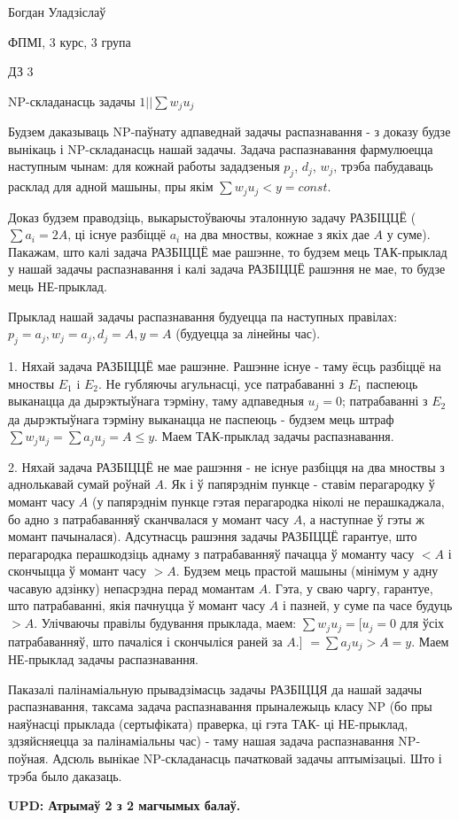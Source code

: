 \documentclass{article}
\begin{document}
{\large

Богдан Уладзіслаў

ФПМІ, 3 курс, 3 група

\vspace{5mm}

ДЗ 3

NP-складанасць задачы $1||\sum w_j u_j$

}

\vspace{15mm}

Будзем даказываць NP-паўнату адпаведнай задачы распазнавання - з доказу будзе вынікаць і NP-складанасць нашай задачы.
Задача распазнавання фармулюецца наступным чынам: для кожнай работы зададзеныя $p_j$, $d_j$, $w_j$, трэба пабудаваць
расклад для адной машыны, пры якім $\sum w_j u_j < y = const$.

Доказ будзем праводзіць, выкарыстоўваючы эталонную задачу РАЗБІЦЦЁ ($\sum a_i = 2A$, ці існуе разбіццё $a_i$ на два мноствы,
кожнае з якіх дае $A$ у суме). Пакажам, што калі задача РАЗБІЦЦЁ мае рашэнне, то
будзем мець ТАК-прыклад у нашай задачы распазнавання і калі задача РАЗБІЦЦЁ рашэння не мае, то будзе мець НЕ-прыклад.

Прыклад нашай задачы распазнавання будуецца па наступных правілах: $p_j = a_j, w_j = a_j, d_j = A, y = A$ (будуецца за лінейны час).

1. Няхай задача РАЗБІЦЦЁ мае рашэнне. Рашэнне існуе - таму ёсць разбіццё на мноствы $E_1$ i $E_2$. Не губляючы агульнасці,
усе патрабаванні з $E_1$ паспеюць выканацца
да дырэктыўнага тэрміну, таму адпаведныя $u_j = 0$; патрабаванні з $E_2$ да дырэктыўнага тэрміну выканацца не паспеюць - будзем мець
штраф $\sum w_j u_j = \sum a_j u_j = A \le y$. Маем ТАК-прыклад задачы распазнавання.

2. Няхай задача РАЗБІЦЦЁ не мае рашэння - не існуе разбіцця на два мноствы з аднолькавай сумай роўнай $A$. Як і ў папярэднім пункце -
ставім перагародку ў момант часу $A$ (у папярэднім пункце гэтая перагародка ніколі не перашкаджала, бо адно з патрабаванняў сканчвалася
у момант часу $A$, а наступнае ў гэты ж момант пачыналася). Адсутнасць рашэння задачы РАЗБІЦЦЁ гарантуе, што перагародка перашкодзіць
аднаму з патрабаванняў пачацца ў моманту часу $<A$ і скончыцца ў момант часу $>A$. Будзем мець прастой машыны (мінімум у адну часавую адзінку)
непасрэдна перад момантам $A$. Гэта, у сваю чаргу, гарантуе, што патрабаванні, якія пачнуцца ў момант часу $A$ і пазней, у суме
па часе будуць $>A$. Улічваючы правілы будування прыклада, маем: $\sum w_j u_j = $[$u_j = 0$ для ўсіх патрабаванняў, што пачаліся і скончыліся
раней за $A$.] $=\sum a_j u_j > A = y$. Маем НЕ-прыклад задачы распазнавання.

Паказалі палінаміальную прывадзімасць задачы РАЗБІЦЦЯ да нашай задачы распазнавання, таксама задача распазнавання прыналежыць класу NP
(бо пры наяўнасці прыклада (сертыфіката) праверка, ці гэта ТАК- ці НЕ-прыклад, здзяйсняецца за палінаміальны час) -
таму нашая задача распазнавання NP-поўная.
Адсюль вынікае NP-складанасць пачатковай задачы аптымізацыі. Што і трэба было даказаць.

\vspace{10mm}

{\color{red} \textbf{UPD: Атрымаў 2 з 2 магчымых балаў.} }
\end{document}
